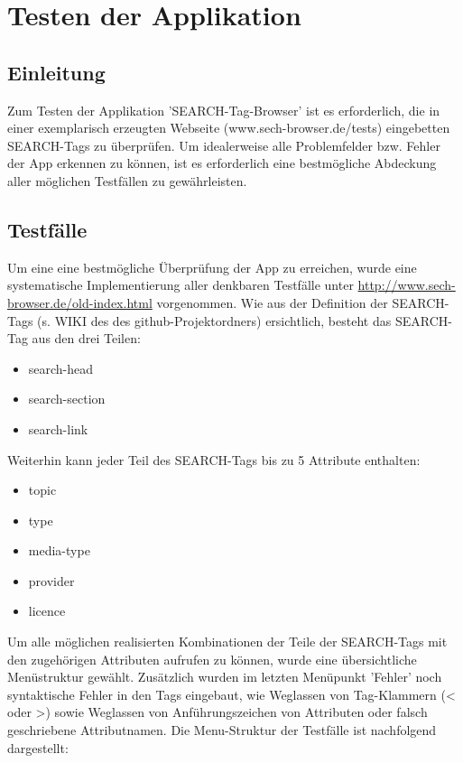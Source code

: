 \chapter{Testen der Applikation}

\section{Einleitung}

Zum Testen der Applikation 'SEARCH-Tag-Browser' ist es erforderlich, die in einer exemplarisch erzeugten Webseite (www.sech-browser.de/tests) eingebetten SEARCH-Tags zu überprüfen. Um idealerweise alle Problemfelder bzw. Fehler der App erkennen zu können, ist es erforderlich eine bestmögliche Abdeckung aller möglichen Testfällen zu gewährleisten.  

\section{Testfälle} 

Um eine eine bestmögliche Überprüfung der App zu erreichen, wurde eine systematische Implementierung aller denkbaren Testfälle unter \url {http://www.sech-browser.de/old-index.html} vorgenommen. Wie aus der Definition der SEARCH-Tags (s. WIKI des des github-Projektordners) ersichtlich, besteht das SEARCH-Tag aus den drei Teilen:

\begin {itemize} 
   \item search-head
   \item search-section
   \item search-link
\end {itemize}

Weiterhin kann jeder Teil des SEARCH-Tags bis zu 5 Attribute enthalten:

\begin {itemize}
   \item topic
   \item type
   \item media-type
   \item provider
   \item licence
\end {itemize}

Um alle möglichen realisierten Kombinationen der Teile der SEARCH-Tags mit den zugehörigen Attributen aufrufen zu können, wurde eine übersichtliche Menüstruktur gewählt. Zusätzlich wurden im letzten Menüpunkt 'Fehler' noch syntaktische Fehler in den Tags eingebaut, wie Weglassen von Tag-Klammern (< oder >) sowie Weglassen von Anführungszeichen von Attributen oder falsch geschriebene Attributnamen.   
Die Menu-Struktur der Testfälle ist nachfolgend dargestellt:

